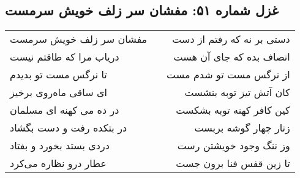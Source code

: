 \begin{center}
\section*{غزل شماره ۵۱: مفشان سر زلف خویش سرمست}
\label{sec:051}
\begin{longtable}{l p{0.5cm} r}
مفشان سر زلف خویش سرمست
&&
دستی بر نه که رفتم از دست
\\
دریاب مرا که طاقتم نیست
&&
انصاف بده که جای آن هست
\\
تا نرگس مست تو بدیدم
&&
از نرگس مست تو شدم مست
\\
ای ساقی ماه‌روی برخیز
&&
کان آتش تیز توبه بنشست
\\
در ده می کهنه ای مسلمان
&&
کین کافر کهنه توبه بشکست
\\
در بتکده رفت و دست بگشاد
&&
زنار چهار گوشه بربست
\\
دردی بستد بخورد و بفتاد
&&
وز ننگ وجود خویشتن رست
\\
عطار درو نظاره می‌کرد
&&
تا زین قفس فنا برون جست
\\
\end{longtable}
\end{center}
